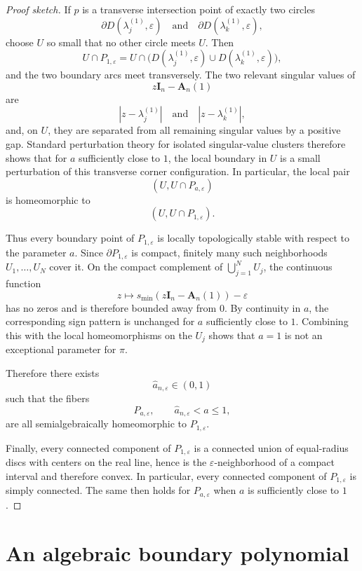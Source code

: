 \documentclass[11pt]{article}
\begin{document}
\begin{proof}[Proof sketch]
If \(p\) is a transverse intersection point of exactly two circles
\[
\partial D(\lambda_j^{(1)},\varepsilon)
\quad\text{and}\quad
\partial D(\lambda_k^{(1)},\varepsilon),
\]
choose \(U\) so small that no other circle meets \(U\). Then
\[
U\cap P_{1,\varepsilon}
=
U\cap\bigl(D(\lambda_j^{(1)},\varepsilon)\cup D(\lambda_k^{(1)},\varepsilon)\bigr),
\]
and the two boundary arcs meet transversely. The two relevant singular values of
\[
z\mathbf I_n-\mathbf A_n(1)
\]
are
\[
|z-\lambda_j^{(1)}|
\quad\text{and}\quad
|z-\lambda_k^{(1)}|,
\]
and, on \(U\), they are separated from all remaining singular values by a positive gap. Standard perturbation theory for isolated singular-value clusters therefore shows that for \(a\) sufficiently close to \(1\), the local boundary in \(U\) is a small perturbation of this transverse corner configuration. In particular, the local pair
\[
(U,U\cap P_{a,\varepsilon})
\]
is homeomorphic to
\[
(U,U\cap P_{1,\varepsilon}).
\]

Thus every boundary point of \(P_{1,\varepsilon}\) is locally topologically stable with respect to the parameter \(a\). Since \(\partial P_{1,\varepsilon}\) is compact, finitely many such neighborhoods \(U_1,\dots,U_N\) cover it. On the compact complement of \(\bigcup_{j=1}^N U_j\), the continuous function
\[
z\longmapsto s_{\min}(z\mathbf I_n-\mathbf A_n(1))-\varepsilon
\]
has no zeros and is therefore bounded away from \(0\). By continuity in \(a\), the corresponding sign pattern is unchanged for \(a\) sufficiently close to \(1\). Combining this with the local homeomorphisms on the \(U_j\) shows that \(a=1\) is not an exceptional parameter for \(\pi\).

Therefore there exists
\[
\widehat a_{n,\varepsilon}\in(0,1)
\]
such that the fibers
\[
P_{a,\varepsilon},
\qquad
\widehat a_{n,\varepsilon}<a\le 1,
\]
are all semialgebraically homeomorphic to \(P_{1,\varepsilon}\).

Finally, every connected component of \(P_{1,\varepsilon}\) is a connected union of equal-radius discs with centers on the real line, hence is the \(\varepsilon\)-neighborhood of a compact interval and therefore convex. In particular, every connected component of \(P_{1,\varepsilon}\) is simply connected. The same then holds for \(P_{a,\varepsilon}\) when \(a\) is sufficiently close to \(1\).
\end{proof}

\section{An algebraic boundary polynomial}
\end{document}
